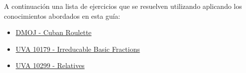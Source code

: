 A continuación una lista de ejercicios que se resuelven utilizando aplicando los conocimientos abordados en esta guía:

\begin{itemize}
	\item \href{https://dmoj.uclv.edu.cu/problem/oci19day1a} {DMOJ - Cuban Roulette}
	\item \href{https://onlinejudge.org/index.php?option=onlinejudge&page=show_problem&problem=1120}{UVA 10179 - Irreducable Basic Fractions}
	\item \href{https://onlinejudge.org/index.php?option=onlinejudge&page=show_problem&problem=1240}{UVA 10299 - Relatives}
\end{itemize}